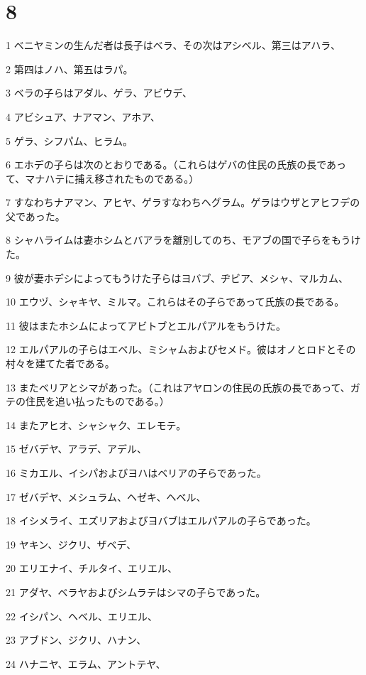 \chapter{8}

\par 1 ベニヤミンの生んだ者は長子はベラ、その次はアシベル、第三はアハラ、
\par 2 第四はノハ、第五はラパ。
\par 3 ベラの子らはアダル、ゲラ、アビウデ、
\par 4 アビシュア、ナアマン、アホア、
\par 5 ゲラ、シフパム、ヒラム。
\par 6 エホデの子らは次のとおりである。（これらはゲバの住民の氏族の長であって、マナハテに捕え移されたものである。）
\par 7 すなわちナアマン、アヒヤ、ゲラすなわちヘグラム。ゲラはウザとアヒフデの父であった。
\par 8 シャハライムは妻ホシムとバアラを離別してのち、モアブの国で子らをもうけた。
\par 9 彼が妻ホデシによってもうけた子らはヨバブ、ヂビア、メシャ、マルカム、
\par 10 エウヅ、シャキヤ、ミルマ。これらはその子らであって氏族の長である。
\par 11 彼はまたホシムによってアビトブとエルパアルをもうけた。
\par 12 エルパアルの子らはエベル、ミシャムおよびセメド。彼はオノとロドとその村々を建てた者である。
\par 13 またベリアとシマがあった。（これはアヤロンの住民の氏族の長であって、ガテの住民を追い払ったものである。）
\par 14 またアヒオ、シャシャク、エレモテ。
\par 15 ゼバデヤ、アラデ、アデル、
\par 16 ミカエル、イシパおよびヨハはベリアの子らであった。
\par 17 ゼバデヤ、メシュラム、ヘゼキ、ヘベル、
\par 18 イシメライ、エズリアおよびヨバブはエルパアルの子らであった。
\par 19 ヤキン、ジクリ、ザベデ、
\par 20 エリエナイ、チルタイ、エリエル、
\par 21 アダヤ、ベラヤおよびシムラテはシマの子らであった。
\par 22 イシパン、ヘベル、エリエル、
\par 23 アブドン、ジクリ、ハナン、
\par 24 ハナニヤ、エラム、アントテヤ、
